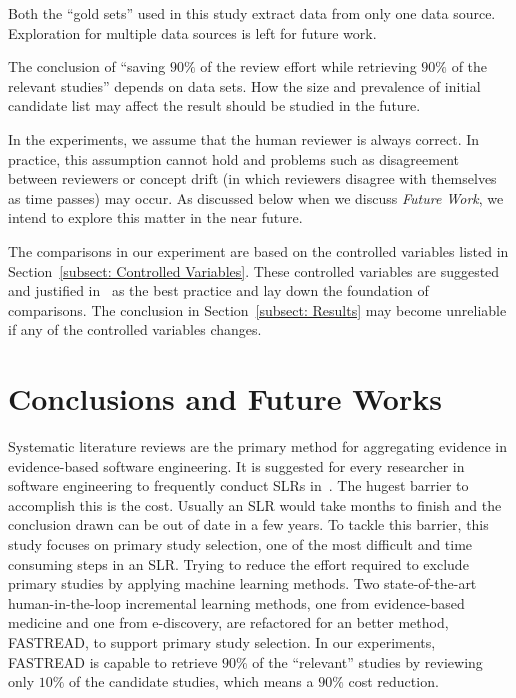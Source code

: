 \documentclass{svjour3}
\theoremstyle{break}
\begin{document}
Both the ``gold sets'' used in this study extract data from only one data source. Exploration for multiple data sources is left for future work. 

The conclusion of ``saving $90\%$ of the review effort while retrieving $90\%$ of the relevant studies'' depends on data sets. How the size and prevalence of initial candidate list may affect the result should be studied in the future.

In the experiments, we assume that the human reviewer is always correct. In practice, this assumption cannot hold and problems such as disagreement between reviewers or concept drift (in which reviewers disagree with themselves as time passes) may occur.  As discussed
below when we discuss {\em Future Work}, we intend to explore this matter in the near future.

The comparisons in our experiment are based on the controlled variables listed in Section~\ref{subsect: Controlled Variables}. These controlled variables are suggested and justified in~\cite{krishna2016bigse} as the best practice and lay down the foundation of comparisons. The conclusion in Section~\ref{subsect: Results} may become unreliable if any of the controlled variables changes.



\section{Conclusions and Future Works}
\label{sect: Conclusion}

Systematic literature reviews are the primary method for aggregating evidence in evidence-based software engineering. It is suggested for every researcher in software engineering to frequently conduct SLRs in~\cite{keele2007guidelines}. The hugest barrier to accomplish this is the cost. Usually an SLR would take months to finish and the conclusion drawn can be out of date in a few years. To tackle this barrier, this study focuses on primary study selection, one of the most difficult and time consuming steps in an SLR. Trying to reduce the effort required to exclude primary studies by applying machine learning methods. Two state-of-the-art human-in-the-loop incremental learning methods, one from evidence-based medicine and one from e-discovery, are refactored for an better method, FASTREAD, to support primary study selection. In our experiments, FASTREAD is capable to retrieve $90\%$ of the ``relevant'' studies by reviewing only $10\%$ of the candidate studies, which means a $90\%$ cost reduction.
\end{document}
